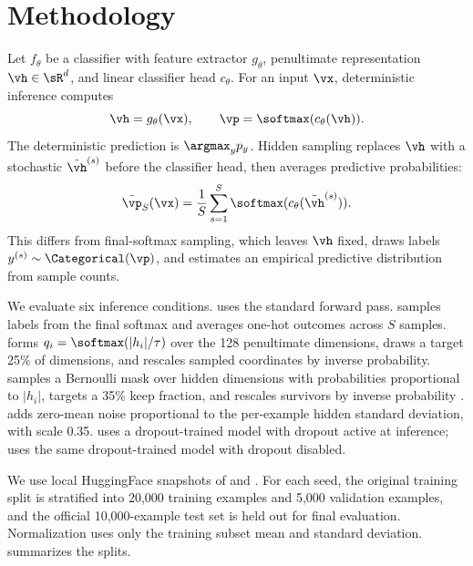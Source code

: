 \section{Methodology}
\label{sec:methodology}



Let $f_\theta$ be a classifier with feature extractor $g_\theta$, penultimate representation $\vh \in \sR^d$, and linear classifier head $c_\theta$. For an input $\vx$, deterministic inference computes
\begin{equation}
    \vh = g_\theta(\vx), \qquad \vp = \softmax(c_\theta(\vh)).
\end{equation}
The deterministic prediction is $\argmax_y p_y$. Hidden sampling replaces $\vh$ with a stochastic $\tilde{\vh}^{(s)}$ before the classifier head, then averages predictive probabilities:
\begin{equation}
    \bar{\vp}_S(\vx) = \frac{1}{S}\sum_{s=1}^S \softmax(c_\theta(\tilde{\vh}^{(s)})).
\end{equation}
This differs from final-softmax sampling, which leaves $\vh$ fixed, draws labels $y^{(s)} \sim \Categorical(\vp)$, and estimates an empirical predictive distribution from sample counts.

We evaluate six inference conditions. \deterministic uses the standard forward pass. \outputsample samples labels from the final softmax and averages one-hot outcomes across $S$ samples. \hiddencategorical forms $q_i = \softmax(|h_i|/\tau)$ over the 128 penultimate dimensions, draws a target 25\% of dimensions, and rescales sampled coordinates by inverse probability. \sap samples a Bernoulli mask over hidden dimensions with probabilities proportional to $|h_i|$, targets a 35\% keep fraction, and rescales survivors by inverse probability \cite{dhillon2018stochastic}. \gaussian adds zero-mean noise proportional to the per-example hidden standard deviation, with scale 0.35. \mcdropout uses a dropout-trained model with dropout active at inference; \dropouteval uses the same dropout-trained model with dropout disabled.

We use local HuggingFace snapshots of \mnist \cite{lecun1998gradient} and \fashionmnist \cite{xiao2017fashion}. For each seed, the original training split is stratified into 20,000 training examples and 5,000 validation examples, and the official 10,000-example test set is held out for final evaluation. Normalization uses only the training subset mean and standard deviation.  summarizes the splits.

